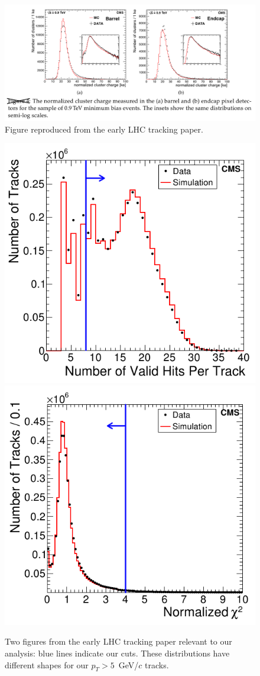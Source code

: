 \documentclass[12pt]{article}
\begin{document}
\begin{figure}
\includegraphics[width=\linewidth]{cluster_charge.png}

\caption{Figure reproduced from the early LHC tracking
  paper. \label{fig:cluster_charge}}
\end{figure}

\begin{figure}
\includegraphics[width=0.5\linewidth]{number_of_hits.png}
\includegraphics[width=0.5\linewidth]{normalized_chi2.png}

\caption{Two figures from the early LHC tracking paper relevant to our
  analysis: blue lines indicate our cuts.  These distributions have
  different shapes for our $p_T > 5$~GeV/$c$
  tracks. \label{fig:ourcuts}}
\end{figure}
\end{document}
